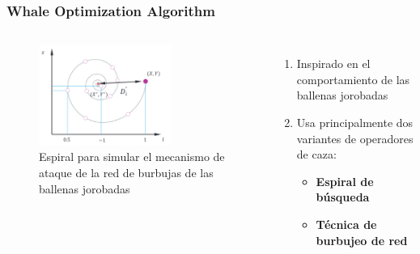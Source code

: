 \begin{frame}
  \frametitle{Whale Optimization Algorithm}
  \begin{columns}
    \begin{figure}
      \begin{center}
        \includegraphics[width=0.7\textwidth]{imagenes/chapter3/spiral-update-position-wao.png}
      \end{center}
      \caption{Espiral para simular el mecanismo de ataque de la red de burbujas de las ballenas jorobadas \footnotemark[8]}
    \end{figure}
    \begin{enumerate}
      \item Inspirado en el comportamiento de las ballenas jorobadas
      \item Usa principalmente dos variantes de operadores de caza:
            \begin{itemize}
              \item \textbf{Espiral de búsqueda}
              \item \textbf{Técnica de burbujeo de red}
            \end{itemize}
    \end{enumerate}
  \end{columns}
\end{frame}


